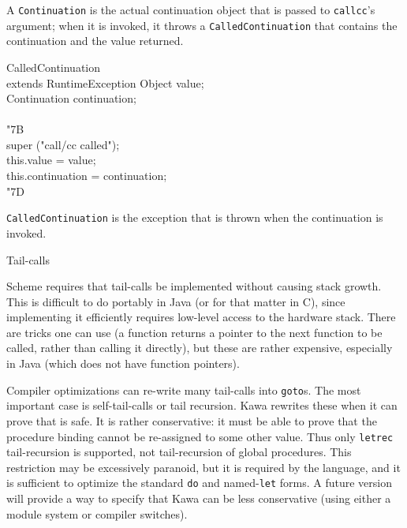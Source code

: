 \documentclass[twocolumn]{article}
\makeatletter
\def\section{\@startsection {section}{1}{\z@}
   {14pt plus 2pt minus 2pt}{12pt plus 2pt minus 2pt} {\large\bf}}
\newcommand{\LBr}{\char"7B}
\newcommand{\RBr}{\char"7D}
\newcommand{\Tab}{\>}
\makeatother
\begin{document}
A {\tt Continuation} is the actual continuation object
that is passed to {\tt callcc}'s argument;
when it is invoked, it throws a {\tt CalledContinuation}
that contains the continuation and the value returned.

\begin{Class}{CalledContinuation}{\\\Tab\Tab extends RuntimeException}
Object value;\\
Continuation continuation;\\
\\
\LBr\+\\
    super ("call/cc called");\\
    this.value = value;\\
    this.continuation = continuation;\-\\
\RBr\\
\end{Class}

{\tt CalledContinuation} is the exception that is thrown
when the continuation is invoked.

\section{Tail-calls}

Scheme requires that tail-calls be implemented without
causing stack growth.  This is difficult to do
portably in Java (or for that matter in C), since implementing
it efficiently requires low-level access to the hardware stack.
There are tricks one can use (a function returns a pointer to the
next function to be called, rather than calling it directly), but
these are rather expensive, especially in Java (which does not
have function pointers).

Compiler optimizations can re-write many tail-calls into
{\tt goto}s.  The most important case is self-tail-calls
or tail recursion.  Kawa rewrites these
when it can prove that is safe.  It is rather
conservative:  it must be able to prove that the procedure
binding cannot be re-assigned to some other value.  Thus
only {\tt letrec} tail-recursion is supported, not
tail-recursion of global procedures.  This restriction may
be excessively paranoid, but it is required by the language,
and it is sufficient to optimize the standard {\tt do}
and named-{\tt let} forms.  A future version will provide a way
to specify that Kawa can be less conservative (using either a
module system or compiler switches).
\end{document}
